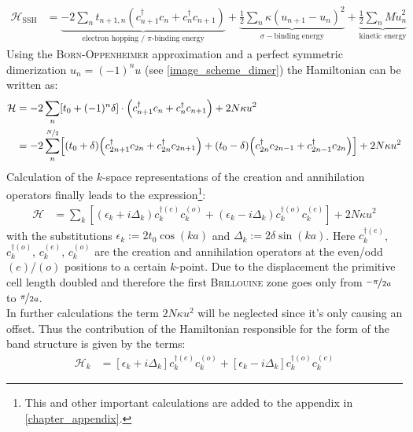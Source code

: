 \begin{align}
	\mathcal{H}_\text{SSH} &= \underbrace{-2\sum_{n} t_{n+1,n}\left(c_{n+1}^\dagger c_n + c_n^\dagger c_{n+1}\right)}_{\text{electron hopping / $\pi$-binding energy}} +
	\underbrace{\frac{1}{2}\sum_n \kappa (u_{n+1} - u_n)^2}_{\sigma-\text{binding energy}} + 
	\underbrace{\frac{1}{2} \sum_n M \dot{u}^2_n}_{\text{kinetic energy}}
\end{align}
Using the \textsc{Born-Oppenheimer} approximation and a perfect symmetric dimerization $u_n = (-1)^nu$ (see \cref{image_scheme_dimer}) the Hamiltonian can be written as:
\begin{align}
	\mathcal{H} &= -2\sum_n \left[t_0 + (-1)^n\delta\right]\cdot\left(c_{n+1}^\dagger c_n + c_n^\dagger c_{n+1}\right) + 2N\kappa u^2\\
	&= -2\sum_n^{\nicefrac{N}{2}} \left[\left(t_0+\delta\right)\left(c_{2n+1}^\dagger c_{2n} + c_{2n}^\dagger c_{2n+1} \right) + 
	\left(t_0-\delta\right)\left(c_{2n}^\dagger c_{2n-1} + c_{2n-1}^\dagger c_{2n} \right)\right]+2N\kappa u^2
	\label{equation_SSH_hamiltonian_real_space}
\end{align}
Calculation of the $k$-space representations of the creation and annihilation operators finally leads to the expression\footnote{This and other important calculations are added to the appendix in \cref{chapter_appendix}.}:
\begin{align}
\mathcal{H} &= \sum_k \left[
\left(\epsilon_k + i\Delta_k\right)c_{k}^{\dagger(e)}c_{k}^{(o)} + \left(\epsilon_k-i\Delta_k \right)	c_{k}^{\dagger(o)}c_{k}^{(e)}\right] + 2N\kappa u^2
\end{align}
with the substitutions $\epsilon_k := 2t_0\cos(ka)$ and $\Delta_k := 2\delta\sin(ka)$. Here $c^{\dagger(e)}_k$, $c^{\dagger(o)}_k$, $c^{(e)}_k$, $c^{(o)}_k$ are the creation and annihilation operators at the even/odd $(e)$/$(o)$ positions to a certain $k$-point. Due to the displacement the primitive cell length doubled and therefore the first \textsc{Brillouine} zone goes only from $\nicefrac{-\pi}{2a}$ to $\nicefrac{\pi}{2a}$.\\
In further calculations the term $2N\kappa u^2$ will be neglected since it's only causing an offset. Thus the contribution of the Hamiltonian responsible for the form of the band structure is given by the terms:
\begin{align}
	\mathcal{H}_k &=
	\left[\epsilon_k + i\Delta_k\right]c_{k}^{\dagger(e)}c_{k}^{(o)} + \left[\epsilon_k-i\Delta_k \right]	c_{k}^{\dagger(o)}c_{k}^{(e)}
\end{align}
